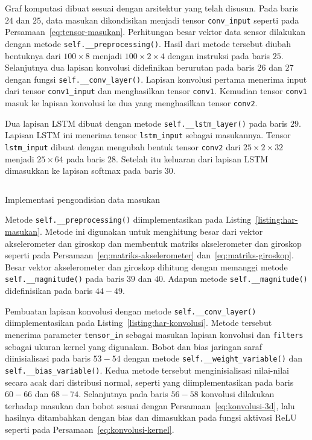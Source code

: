 Graf komputasi dibuat sesuai dengan arsitektur yang telah disusun. Pada baris $24$ dan $25$, data masukan dikondisikan menjadi tensor \texttt{conv_input} seperti pada Persamaan~\ref{eq:tensor-masukan}. Perhitungan besar vektor data sensor dilakukan dengan metode \texttt{self.__preprocessing()}. Hasil dari metode tersebut diubah bentuknya dari $100 \times 8$ menjadi $100 \times 2 \times 4$ dengan instruksi pada baris $25$. Selanjutnya dua lapisan konvolusi didefinikan berurutan pada baris $26$ dan $27$ dengan fungsi \texttt{self.__conv_layer()}. Lapisan konvolusi pertama menerima input dari tensor \texttt{conv1_input} dan menghasilkan tensor \texttt{conv1}. Kemudian tensor \texttt{conv1} masuk ke lapisan konvolusi ke dua yang menghasilkan tensor \texttt{conv2}.

Dua lapisan LSTM dibuat dengan metode \texttt{self.__lstm_layer()} pada baris $29$. Lapisan LSTM ini menerima tensor \texttt{lstm_input} sebagai masukannya. Tensor \texttt{lstm_input} dibuat dengan mengubah bentuk tensor \texttt{conv2} dari $25 \times 2 \times 32$ menjadi $25 \times 64$ pada baris $28$. Setelah itu keluaran dari lapisan LSTM dimasukkan ke lapisan softmax pada baris $30$.

\begin{listing}[h]
    \inputminted[firstline=33,firstnumber=33,lastline=49,gobble=4]{python}{../har/har.py}
    \caption{Implementasi pengondisian data masukan}
    \label{listing:har-masukan}
\end{listing}

Metode \texttt{self.__preprocessing()} diimplementasikan pada Listing~\ref{listing:har-masukan}. Metode ini digunakan untuk menghitung besar dari vektor akselerometer dan giroskop dan membentuk matriks akselerometer dan giroskop seperti pada Persamaan~\ref{eq:matriks-akselerometer} dan~\ref{eq:matriks-giroskop}. Besar vektor akselerometer dan giroskop dihitung dengan memanggi metode \texttt{self.__magnitude()} pada baris $39$ dan $40$. Adapun metode \texttt{self.__magnitude()} didefinisikan pada baris $44 - 49$.

Pembuatan lapisan konvolusi dengan metode \texttt{self.__conv_layer()} diimplementasikan pada Listing~\ref{listing:har-konvolusi}. Metode tersebut menerima parameter \texttt{tensor_in} sebagai masukan lapisan konvolusi dan \texttt{filters} sebagai ukuran kernel yang digunakan. Bobot dan bias jaringan saraf diinisialisasi pada baris $53 - 54$ dengan metode \texttt{self.__weight_variable()} dan \texttt{self.__bias_variable()}. Kedua metode tersebut menginisialisasi nilai-nilai secara acak dari distribusi normal, seperti yang diimplementasikan pada baris $60 - 66$ dan $68 - 74$. Selanjutnya pada baris $56 - 58$ konvolusi dilakukan terhadap masukan dan bobot sesuai dengan Persamaan~\ref{eq:konvolusi-3d}, lalu hasilnya ditambahkan dengan bias dan dimasukkan pada fungsi aktivasi ReLU seperti pada Persamaan~\ref{eq:konvolusi-kernel}.

